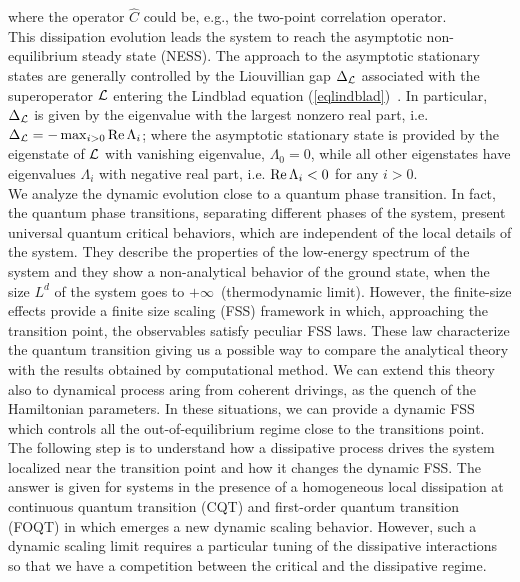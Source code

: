 {where the operator $\hat{C}$ could be, e.g., the two-point
correlation operator.\\
This dissipation evolution leads the system to reach the 
asymptotic non-equilibrium steady state (NESS).
The approach to the asymptotic stationary states are generally
controlled by the Liouvillian gap $\Delta_{\cal L}$ associated with
the superoperator ${\cal L}$ entering the Lindblad equation
(\ref{eqlindblad})~\cite{BP-openquantumsystembook,RH-book,Z-2015-relaxtimes,MBBC-18,KS-2020-boundarydephasing}. In particular, $\Delta_{\cal L}$ is given
by the eigenvalue with the largest nonzero real part, i.e. $\Delta_{\cal L} = - \max _{i>0}{\rm Re}\,\Lambda_i$; where the asymptotic stationary state is provided by the eigenstate of
${\cal L}$ with vanishing eigenvalue, $\Lambda_0=0$, while all other
eigenstates have eigenvalues $\Lambda_i$ with negative real part,
i.e. ${\rm Re}\,\Lambda_i<0$ for any $i>0$.
}\\

We analyze the dynamic evolution close to a quantum phase transition. In fact, the quantum phase transitions, separating different phases of the system, present universal quantum critical behaviors, which are independent of the local details of the system. They describe the properties of the low-energy spectrum of the system and they show a non-analytical behavior of the ground state, when the size $L^d$ of the system goes to $+\infty\,$ (thermodynamic limit). However, the finite-size effects provide a finite size scaling (FSS) framework in which, approaching the transition point, the observables satisfy peculiar FSS laws. These law characterize the quantum transition giving us a possible way to compare the analytical theory with the results obtained by computational method. We can extend this theory also to dynamical process aring from coherent drivings, as the quench of the Hamiltonian parameters. In these situations, we can provide a dynamic FSS which controls all the out-of-equilibrium regime close to the transitions point. The following step is to understand how a dissipative process drives the system localized near the transition point and how it changes the dynamic FSS. The answer is given for systems in the presence of a homogeneous local dissipation at continuous quantum transition (CQT) \cite{NRV-2019-competingdissipativeandcoherent} and first-order quantum transition (FOQT) \cite{di2020dissipative} in which emerges a new dynamic scaling behavior. However, such a dynamic scaling limit requires a particular tuning of the dissipative interactions so that we have a competition between the critical and the dissipative regime. 

